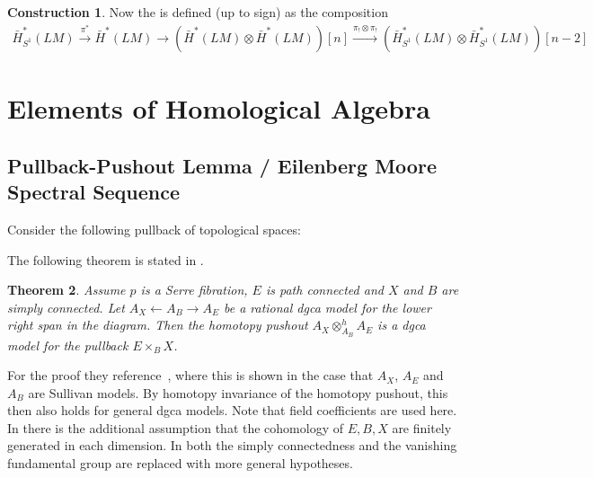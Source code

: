 \documentclass{scrartcl}
\let\emph\relax
\theoremstyle{plain}
\newtheorem{theorem}{Theorem}[section]
\theoremstyle{definition}
\newtheorem{construction}[theorem]{Construction}
\let\xto\xrightarrow
\begin{document}
\begin{construction}
    Now the \emph{string bracket} is defined (up to sign) as the composition
\begin{align*}
    \bar H_{S^1}^*(LM) \xto{\pi^*} \bar H^*(LM)\to (\bar H^*(LM) \otimes \bar H^*(LM))[n] \xto{\pi_!\otimes\pi_!} (\bar H^*_{S^1}(LM)\otimes\bar H^*_{S^1}(LM))[n-2]
\end{align*}
\end{construction}



\section{Elements of Homological Algebra}

\subsection{Pullback-Pushout Lemma / Eilenberg Moore Spectral Sequence}\label{subsec:eilenberg_moore}
Consider the following pullback of topological spaces:
\begin{center}
\end{center}

The following theorem is stated in \cite{felix2012rational}.
\begin{theorem}
Assume $p$ is a Serre fibration, $E$ is path connected and $X$ and $B$ are simply connected. Let $A_X \leftarrow A_B \rightarrow A_E$ be a rational dgca model for the lower right span in the diagram. Then the homotopy pushout $A_X \otimes_{A_B}^h A_E$ is a dgca model for the pullback $E\times_B X$.
\end{theorem}
For the proof they reference~\cite[Proposition 15.8]{naef2022string}, where this is shown in the case that $A_X$, $A_E$ and $A_B$ are Sullivan models. By homotopy invariance of the homotopy pushout, this then also holds for general dgca models. Note that field coefficients are used here. In \cite{hatcher2004spectral} there is the additional assumption that the cohomology of $E, B, X$ are finitely generated in each dimension. In \cite{ramzi_eilenberg} both the simply connectedness and the vanishing fundamental group are replaced with more general hypotheses.
\end{document}
